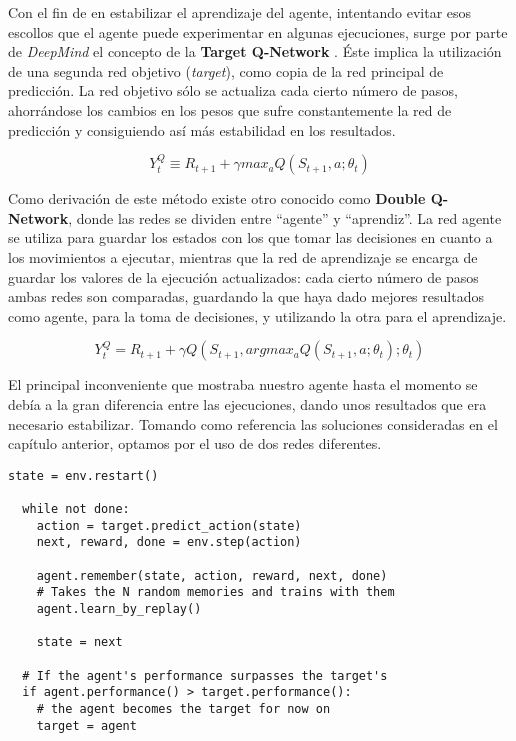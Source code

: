 Con el fin de en estabilizar el aprendizaje del agente, intentando evitar esos escollos que el agente puede experimentar en algunas ejecuciones, surge por parte de \textit{DeepMind} el concepto de la \textbf{Target Q-Network} \citep{NIPS2010_3964}. Éste implica la utilización de una segunda red objetivo (\textit{target}), como copia de la red principal de predicción. La red objetivo sólo se actualiza cada cierto número de pasos, ahorrándose los cambios en los pesos que sufre constantemente la red de predicción y consiguiendo así más estabilidad en los resultados.

$$Y^Q_{t} \equiv R_{t+1} + \gamma max_{a} Q(S_{t+1}, a; \theta_{t})$$

Como derivación de este método existe otro conocido como \textbf{Double Q-Network}, donde las redes se dividen entre ``agente'' y ``aprendiz''. La red agente se utiliza para guardar los estados con los que tomar las decisiones en cuanto a los movimientos a ejecutar, mientras que la red de aprendizaje se encarga de guardar los valores de la ejecución actualizados: cada cierto número de pasos ambas redes son comparadas, guardando la que haya dado mejores resultados como agente, para la toma de decisiones, y utilizando la otra para el aprendizaje.

$$Y^Q_{t} = R_{t+1} + \gamma Q(S_{t+1}, argmax_{a} Q(S_{t+1}, a; \theta_{t}); \theta_{t})$$

El principal inconveniente que mostraba nuestro agente hasta el momento se debía a la gran diferencia entre las ejecuciones, dando unos resultados que era necesario estabilizar. Tomando como referencia las soluciones consideradas en el capítulo anterior, optamos por el uso de dos redes diferentes.

\begin{minipage}{0.9\linewidth}%
\begin{lstlisting}[frame=tb, caption=Pseudocódigo DoubleAgent, inputencoding=latin1, label=code:cartpole_drl4]
  state = env.restart()

  while not done:
    action = target.predict_action(state)
    next, reward, done = env.step(action)

    agent.remember(state, action, reward, next, done)
    # Takes the N random memories and trains with them
    agent.learn_by_replay()

    state = next

  # If the agent's performance surpasses the target's
  if agent.performance() > target.performance():
    # the agent becomes the target for now on
    target = agent
        
\end{lstlisting}%
\end{minipage}

